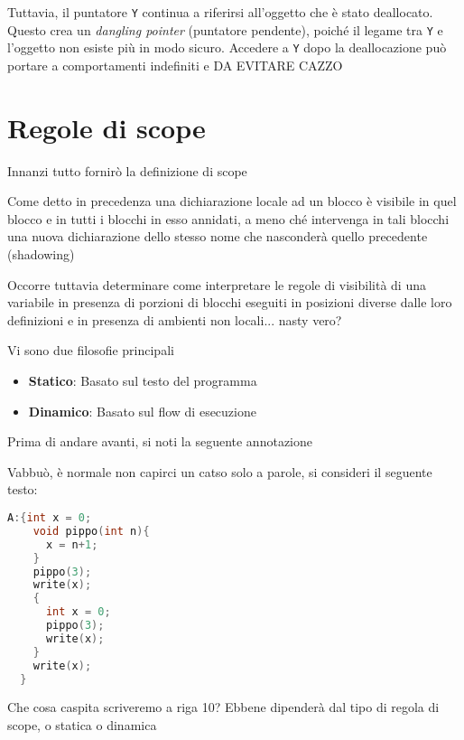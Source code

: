 \begin{itemize}
  Tuttavia, il puntatore \texttt{Y} continua a riferirsi all'oggetto  
  che è stato deallocato. Questo crea un \textit{dangling pointer} (puntatore pendente),  
  poiché il legame tra \texttt{Y} e l'oggetto non esiste più in modo sicuro.  
  Accedere a \texttt{Y} dopo la deallocazione può portare a comportamenti indefiniti e DA EVITARE CAZZO 


\end{itemize}




\section{Regole di scope}

Innanzi tutto fornirò la definizione di scope


Come detto in precedenza una dichiarazione locale ad un blocco è visibile in quel blocco e in tutti i blocchi in esso annidati, a meno ché intervenga in tali blocchi una nuova dichiarazione dello stesso nome che nasconderà quello precedente (shadowing)

Occorre tuttavia determinare come interpretare le regole di visibilità di una variabile in presenza di porzioni di blocchi eseguiti in posizioni diverse dalle loro definizioni  e in presenza di ambienti non locali... nasty vero?

Vi sono due filosofie principali
\begin{itemize}
  \item \textbf{Statico}: Basato sul testo del programma 
  \item \textbf{Dinamico}: Basato sul flow di esecuzione 
\end{itemize}

Prima di andare avanti, si noti la seguente annotazione 

Vabbuò, è normale non capirci un catso solo a parole, si consideri il seguente testo:
\begin{lstlisting}[language=C]
  A:{int x = 0;
    void pippo(int n){
      x = n+1;
    }
    pippo(3);
    write(x);
    {
      int x = 0;
      pippo(3);
      write(x);
    }
    write(x);
  }
\end{lstlisting}
Che cosa caspita scriveremo a riga 10? Ebbene dipenderà dal tipo di regola di scope, o statica o dinamica

